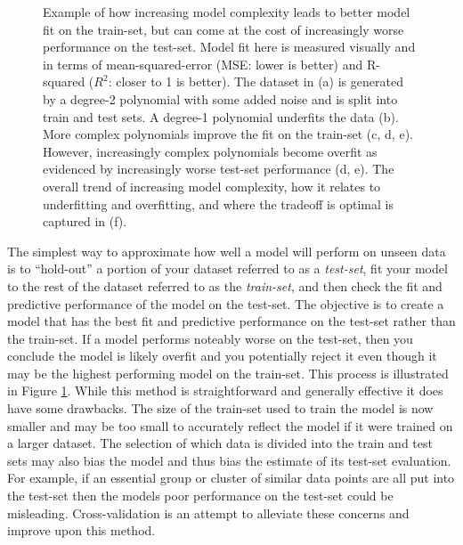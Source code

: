 \begin{figure}
	\caption{Example of how increasing model complexity leads to better model fit on the train-set, but can come at the cost of increasingly worse performance on the test-set. Model fit here is measured visually and in terms of mean-squared-error (MSE: lower is better) and R-squared ($R^2$: closer to 1 is better). The dataset in (a) is generated by a degree-2 polynomial with some added noise and is split into train and test sets. A degree-1 polynomial underfits the data (b). More complex polynomials improve the fit on the train-set (c, d, e). However, increasingly complex polynomials become overfit as evidenced by increasingly worse test-set performance (d, e). The overall trend of increasing model complexity, how it relates to underfitting and overfitting, and where the tradeoff is optimal is captured in (f).}
	\label{fig:overfitting_example}
\end{figure}

The simplest way to approximate how well a model will perform on unseen data is to ``hold-out'' a portion of your dataset referred to as a \textit{test-set}, fit your model to the rest of the dataset referred to as the \textit{train-set}, and then check the fit and predictive performance of the model on the test-set. The objective is to create a model that has the best fit and predictive performance on the test-set rather than the train-set. If a model performs noteably worse on the test-set, then you conclude the model is likely overfit and you potentially reject it even though it may be the highest performing model on the train-set. This process is illustrated in Figure \ref{fig:overfitting_example}.  While this method is straightforward and generally effective it does have some drawbacks. The size of the train-set used to train the model is now smaller and may be too small to accurately reflect the model if it were trained on a larger dataset. The selection of which data is divided into the train and test sets may also bias the model and thus bias the estimate of its test-set evaluation. For example, if an essential group or cluster of similar data points are all put into the test-set then the models poor performance on the test-set could be misleading. Cross-validation is an attempt to alleviate these concerns and improve upon this method.

